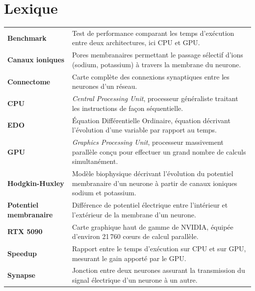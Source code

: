 \documentclass{report}
\title{\DocName}
\author{\DocAuthors}
\date{\textbf{JUNIA - ISEN - AP4} \url{https://github.com/KeanuGauthier/Socle-Modele-Neuronaux-RD.git}}
\begin{document}
\maketitle

\chapter*{Lexique}

\begin{tabular}{@{}p{4cm}p{11cm}@{}}
    \textbf{Benchmark} & Test de performance comparant les temps d'exécution entre deux architectures, ici CPU et GPU. \\[6pt]
    \textbf{Canaux ioniques} & Pores membranaires permettant le passage sélectif d'ions (sodium, potassium) à travers la membrane du neurone. \\[6pt]
    \textbf{Connectome} & Carte complète des connexions synaptiques entre les neurones d'un réseau. \\[6pt]
    \textbf{CPU} & \textit{Central Processing Unit}, processeur généraliste traitant les instructions de façon séquentielle. \\[6pt]
    \textbf{EDO} & Équation Différentielle Ordinaire, équation décrivant l'évolution d'une variable par rapport au temps. \\[6pt]
    \textbf{GPU} & \textit{Graphics Processing Unit}, processeur massivement parallèle conçu pour effectuer un grand nombre de calculs simultanément. \\[6pt]
    \textbf{Hodgkin-Huxley} & Modèle biophysique décrivant l'évolution du potentiel membranaire d'un neurone à partir de canaux ioniques sodium et potassium. \\[6pt]
    \textbf{Potentiel membranaire} & Différence de potentiel électrique entre l'intérieur et l'extérieur de la membrane d'un neurone. \\[6pt]
    \textbf{RTX 5090} & Carte graphique haut de gamme de NVIDIA, équipée d'environ 21\,760 cœurs de calcul parallèle. \\[6pt]
    \textbf{Speedup} & Rapport entre le temps d'exécution sur CPU et sur GPU, mesurant le gain apporté par le GPU. \\[6pt]
    \textbf{Synapse} & Jonction entre deux neurones assurant la transmission du signal électrique d'un neurone à un autre. \\[6pt]
\end{tabular}

\tableofcontents
\end{document}
